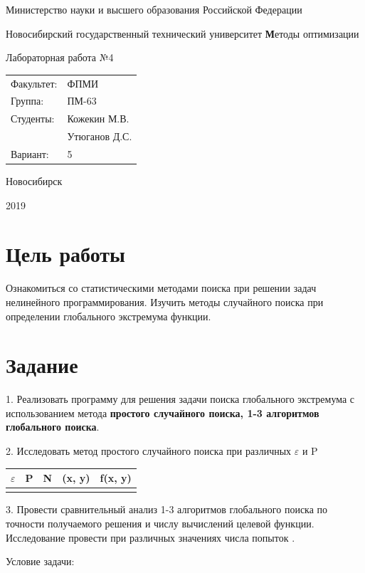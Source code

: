 \documentclass[12pt, a4paper]{article}
\newcommand{\insertTitle}[7]{
\begin{titlepage}
	\begin{center}
    	\large
		Министерство науки и высшего образования Российской Федерации
		
		Новосибирский государственный технический университет
		\vfill
		{\textbf #1}
		
		Лабораторная работа №#2
		\vfill
	\end{center}
	
	\begin{tabular}{ m{7em}  m{7em} }
	Факультет: & ФПМИ \\ 
	Группа: & #3 \\  
	Студенты: & #4 \\
	& #5 \\
	Вариант: & #6
	\end{tabular}
	\vfill

\begin{center}
Новосибирск

#7
\end{center}
\end{titlepage}
}
\begin{document}
\insertTitle{Методы оптимизации}{4}{ПМ-63}{Кожекин М.В.}{Утюганов Д.С.}{5}{2019}




\section{Цель работы}

Ознакомиться со статистическими методами поиска при решении задач нелинейного программирования. Изучить методы случайного поиска при определении глобального экстремума функции.




\section{Задание}

1. Реализовать программу для решения задачи поиска глобального экстремума с использованием метода {\bf простого случайного поиска, 1-3 алгоритмов глобального поиска}.

2. Исследовать метод простого случайного поиска при различных $\varepsilon$ и P

\begin{tabular}{ | l | l | l | l | l |}
	\hline
		$\varepsilon$ & P & N & (x, y) & f(x, y) \\ \hline
		 &  &  &  & \\
	\hline
\end{tabular}



3. Провести сравнительный анализ 1-3 алгоритмов глобального поиска по точности получаемого решения и числу вычислений целевой функции. Исследование провести при различных значениях числа попыток  .


Условие задачи:
\end{document}
